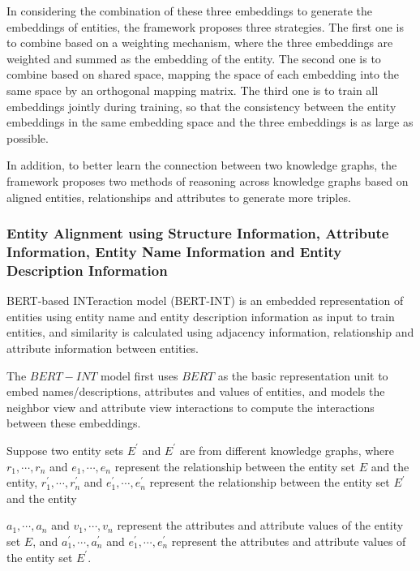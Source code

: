 \documentclass[sigconf]{acmart}
\begin{document}
{In considering the combination of these three embeddings to generate the embeddings of entities, the framework proposes three strategies. The first one is to combine based on a weighting mechanism, where the three embeddings are weighted and summed as the embedding of the entity. The second one is to combine based on shared space, mapping the space of each embedding into the same space by an orthogonal mapping matrix. The third one is to train all embeddings jointly during training, so that the consistency between the entity embeddings in the same embedding space and the three embeddings is as large as possible.

In addition, to better learn the connection between two knowledge graphs, the framework proposes two methods of reasoning across knowledge graphs based on aligned entities, relationships and attributes to generate more triples.

\subsubsection{Entity Alignment using Structure Information, Attribute Information, Entity Name Information and Entity Description Information}

BERT-based INTeraction model (BERT-INT) \cite{tang2020bert} is an embedded representation of entities using entity name and entity description information as input to train entities, and similarity is calculated using adjacency information, relationship and attribute information between entities.

The $BERT-INT$ model first uses $BERT$ as the basic representation unit to embed names/descriptions, attributes and values of entities, and models the neighbor view and attribute view interactions to compute the interactions between these embeddings.

Suppose two entity sets $E^\prime$ and $E^\prime$ are from different knowledge graphs, where ${r_1,\cdots,r_n}$ and ${e_1,\cdots,e_n}$ represent the relationship between the entity set $E$ and the entity, ${r_1^\prime,\cdots,r_n^\prime}$ and ${e_1^\prime,\cdots,e_n^\prime}$ represent the relationship between the entity set $E^\prime$ and the entity

${a_1,\cdots,a_n}$  and ${v_1,\cdots,v_n}$  represent the attributes and attribute values of the entity set $E$, and ${a_1^\prime,\cdots,a_n^\prime}$ and ${e_1^\prime,\cdots,e_n^\prime}$ represent the attributes and attribute values of the entity set $E^\prime$.

}
\end{document}
